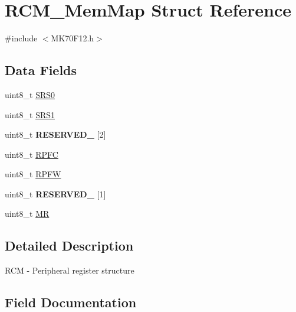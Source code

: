 \hypertarget{struct_r_c_m___mem_map}{}\section{R\+C\+M\+\_\+\+Mem\+Map Struct Reference}
\label{struct_r_c_m___mem_map}


{\ttfamily \#include $<$M\+K70\+F12.\+h$>$}

\subsection*{Data Fields}
\begin{DoxyCompactItemize}
\item 
uint8\+\_\+t \hyperlink{struct_r_c_m___mem_map_aa28b91bdb2e1acc454f7bcb9ad26efb7}{S\+R\+S0}
\item 
uint8\+\_\+t \hyperlink{struct_r_c_m___mem_map_a8e7926e6f51e64e63e5ed3adb7aee612}{S\+R\+S1}
\item 
\hypertarget{struct_r_c_m___mem_map_a5eaf5837cabca1357756d67c06f69ca6}{}uint8\+\_\+t {\bfseries R\+E\+S\+E\+R\+V\+E\+D\+\_} \mbox{[}2\mbox{]}\label{struct_r_c_m___mem_map_a5eaf5837cabca1357756d67c06f69ca6}

\item 
uint8\+\_\+t \hyperlink{struct_r_c_m___mem_map_ace89c039f8342f8b5dd26c3c7b8309a2}{R\+P\+F\+C}
\item 
uint8\+\_\+t \hyperlink{struct_r_c_m___mem_map_ac458f95f6aa234285f568694a5b8240d}{R\+P\+F\+W}
\item 
\hypertarget{struct_r_c_m___mem_map_ac5c6255c10a59b7d083d7721ebc7a580}{}uint8\+\_\+t {\bfseries R\+E\+S\+E\+R\+V\+E\+D\+\_} \mbox{[}1\mbox{]}\label{struct_r_c_m___mem_map_ac5c6255c10a59b7d083d7721ebc7a580}

\item 
uint8\+\_\+t \hyperlink{struct_r_c_m___mem_map_a0e7b707ffc94ef2a3c49a5ca51acc6c9}{M\+R}
\end{DoxyCompactItemize}


\subsection{Detailed Description}
R\+C\+M -\/ Peripheral register structure 

\subsection{Field Documentation}
\hypertarget{struct_r_c_m___mem_map_a0e7b707ffc94ef2a3c49a5ca51acc6c9}{}
